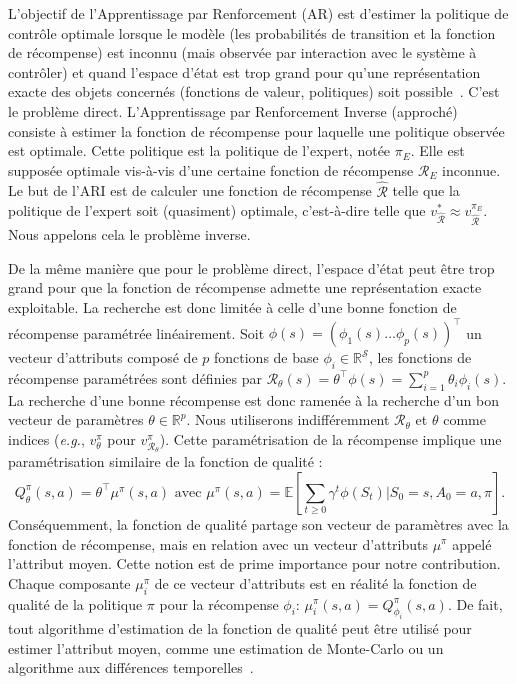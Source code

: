 \documentclass[english,utf8]{./hermes-journal}
\newcommand{\R}{\mathcal{R}}
\newcommand{\s}{\mathcal{S}}
\newcommand{\E}{\mathbb{E}}
\begin{document}
L'objectif de l'Apprentissage par Renforcement (AR) est d'estimer la politique de contrôle optimale lorsque le modèle (les probabilités de transition et la fonction de récompense) est inconnu (mais observée par interaction avec le système à contrôler) et quand l'espace d'état est trop grand pour qu'une représentation exacte des objets concernés (fonctions de valeur, politiques) soit possible~\cite{Bertsekas:1996,Sutton:1998,szepesvari2010c}.
%
C'est le problème direct.
%
L'Apprentissage par Renforcement Inverse (approché)~\cite{Ng:2000} consiste à estimer la fonction de récompense pour laquelle une politique observée est optimale.
%
Cette politique est la politique de l'expert, notée $\pi_E$. Elle est supposée optimale vis-à-vis d'une certaine fonction de récompense $\mathcal{R}_E$ inconnue. Le but de l'ARI est de calculer une fonction de récompense $\hat{\R}$ telle que la politique de l'expert soit (quasiment) optimale, c'est-à-dire telle que $v^*_{\hat{\R}}
\approx v^{\pi_E}_{\hat{\R}}$.
%
Nous appelons cela le problème inverse.

De la même manière que pour le problème direct, l'espace d'état peut être trop grand pour que la fonction de récompense admette une représentation exacte exploitable. La recherche est donc limitée à celle d'une bonne fonction de récompense paramétrée linéairement. Soit $\phi(s) = (\phi_1(s)  \dots
\phi_p(s))^\top$
un vecteur d'attributs composé de $p$ fonctions de base $\phi_i\in\mathbb{R}^\s$, les fonctions de récompense paramétrées sont définies par $\R_\theta(s) = \theta^\top \phi(s) = \sum_{i=1}^p
\theta_i \phi_i(s)$.
La recherche d'une bonne récompense est donc ramenée à la recherche d'un bon vecteur de paramètres $\theta \in\mathbb{R}^p$. Nous utiliserons indifféremment $\R_\theta$ et $\theta$ comme indices (\textit{e.g.}, $v_\theta^\pi$ pour $v_{\R_\theta}^\pi$).
Cette paramétrisation de la récompense implique une paramétrisation similaire de la fonction de qualité :
\begin{equation}
  Q^\pi_\theta(s,a) = \theta^\top \mu^\pi(s,a) \text{ avec }
  \mu^\pi(s,a) = \E[\sum_{t\geq 0} \gamma^t
  \phi(S_t)|S_0=s,A_0=a,\pi].
  \label{eq:def:mu}
\end{equation}
Conséquemment, la fonction de qualité partage son vecteur de paramètres avec la fonction de récompense, mais en relation avec un vecteur d'attributs $\mu^\pi$ appelé l'attribut moyen. Cette notion est de prime importance pour notre contribution. Chaque composante $\mu_i^\pi$ de ce vecteur d'attributs est en réalité la fonction de qualité de la politique $\pi$ pour la récompense $\phi_i$: $\mu_i^\pi(s,a) = Q^\pi_{\phi_i}(s,a)$. De fait, tout algorithme d'estimation de la fonction de qualité peut être utilisé pour estimer l'attribut moyen, comme une estimation de Monte-Carlo ou un algorithme aux différences temporelles~\cite{Klein:2011}.
\end{document}
